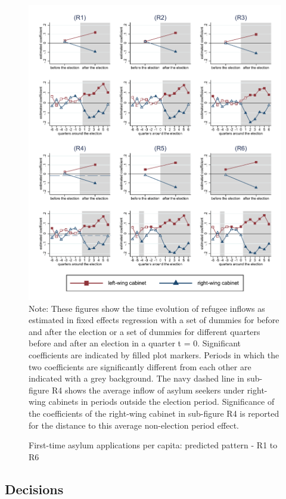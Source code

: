 \documentclass[a4paper,12pt]{article}
\begin{document}
\begin{figure}
	\caption{First-time asylum applications per capita: predicted pattern - R1 to R6}
	\includegraphics[width=1\textwidth]{../results/applications/app_graphs_R1-R6.pdf}
	\scriptsize{Note: These figures show the time evolution of refugee inflows as estimated in fixed effects regression with a set of dummies for before and after the election or a set of dummies for different quarters before and after an election in a quarter t = 0. Significant coefficients are indicated by filled plot markers. Periods in which the two coefficients are significantly different from each other are indicated with a grey background. The navy dashed line in sub-figure R4 shows the average inflow of asylum seekers under right-wing cabinets in periods outside the election period. Significance of the coefficients of the right-wing cabinet in sub-figure R4 is reported for the distance to this average non-election period effect.}
	\label{graph_robustness}
\end{figure} 

\subsection{Decisions}
\end{document}
